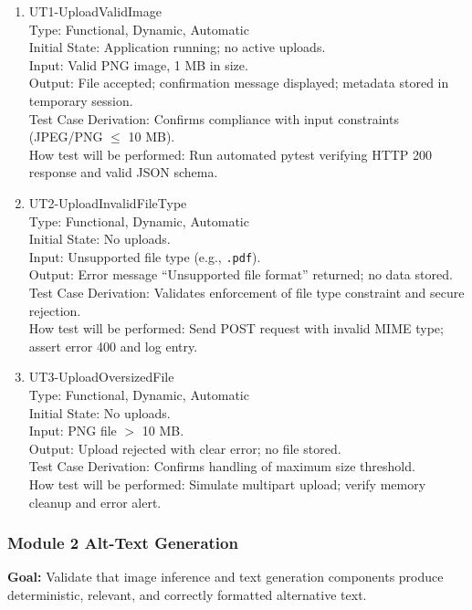\documentclass[12pt, titlepage]{article}
\begin{document}
\begin{enumerate}
\item{UT1-UploadValidImage\\}
Type: Functional, Dynamic, Automatic\\
Initial State: Application running; no active uploads.\\
Input: Valid PNG image, 1 MB in size.\\
Output: File accepted; confirmation message displayed; metadata stored in temporary session.\\
Test Case Derivation: Confirms compliance with input constraints (JPEG/PNG $\leq$ 10 MB).\\
How test will be performed: Run automated pytest verifying HTTP 200 response and valid JSON schema.

\item{UT2-UploadInvalidFileType\\}
Type: Functional, Dynamic, Automatic\\
Initial State: No uploads.\\
Input: Unsupported file type (e.g., \texttt{.pdf}).\\
Output: Error message ``Unsupported file format'' returned; no data stored.\\
Test Case Derivation: Validates enforcement of file type constraint and secure rejection.\\
How test will be performed: Send POST request with invalid MIME type; assert error 400 and log entry.

\item{UT3-UploadOversizedFile\\}
Type: Functional, Dynamic, Automatic\\
Initial State: No uploads.\\
Input: PNG file $>$ 10 MB.\\
Output: Upload rejected with clear error; no file stored.\\
Test Case Derivation: Confirms handling of maximum size threshold.\\
How test will be performed: Simulate multipart upload; verify memory cleanup and error alert.
\end{enumerate}

\subsubsection{Module 2 \textemdash{} Alt-Text Generation}

\textbf{Goal:} Validate that image inference and text generation components produce deterministic, relevant, and correctly formatted alternative text.
\end{document}
